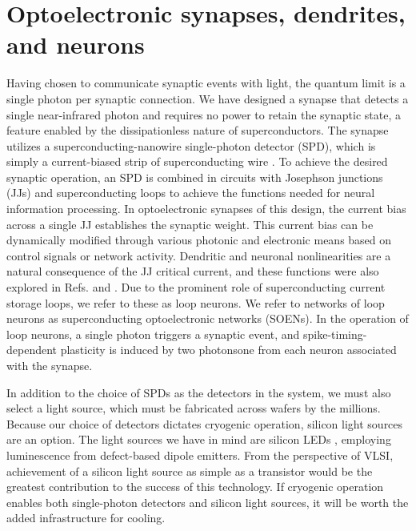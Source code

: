 \documentclass[twocolumn]{article}
\newcommand{\onlinecite}[1]{\hspace{-1 ex} \nocite{#1}\citenum{#1}}
\begin{document}
{\section{\label{sec:synapsesDendritesAndNeurons}Optoelectronic synapses, dendrites, and neurons}
Having chosen to communicate synaptic events with light, the quantum limit is a single photon per synaptic connection. We have designed a synapse \cite{sh2018,sh2020} that detects a single near-infrared photon and requires no power to retain the synaptic state, a feature enabled by the dissipationless nature of superconductors. The synapse utilizes a superconducting-nanowire single-photon detector (SPD), which is simply a current-biased strip of superconducting wire \cite{mave2013}. To achieve the desired synaptic operation, an SPD is combined in circuits with Josephson junctions (JJs) and superconducting loops to achieve the functions needed for neural information processing. In optoelectronic synapses of this design, the current bias across a single JJ establishes the synaptic weight. This current bias can be dynamically modified through various photonic and electronic means based on control signals or network activity. Dendritic and neuronal nonlinearities are a natural consequence of the JJ critical current, and these functions were also explored in Refs. \onlinecite{sh2018} and \onlinecite{sh2020}. Due to the prominent role of superconducting current storage loops, we refer to these as loop neurons. We refer to networks of loop neurons as superconducting optoelectronic networks (SOENs). In the operation of loop neurons, a single photon triggers a synaptic event, and spike-timing-dependent plasticity is induced by two photons\textemdash one from each neuron associated with the synapse.

In addition to the choice of SPDs as the detectors in the system, we must also select a light source, which must be fabricated across wafers by the millions. Because our choice of detectors dictates cryogenic operation, silicon light sources are an option. The light sources we have in mind are silicon LEDs \cite{buch2017}, employing luminescence from defect-based dipole emitters. From the perspective of VLSI, achievement of a silicon light source as simple as a transistor would be the greatest contribution to the success of this technology. If cryogenic operation enables both single-photon detectors and silicon light sources, it will be worth the added infrastructure for cooling.

}
\end{document}
